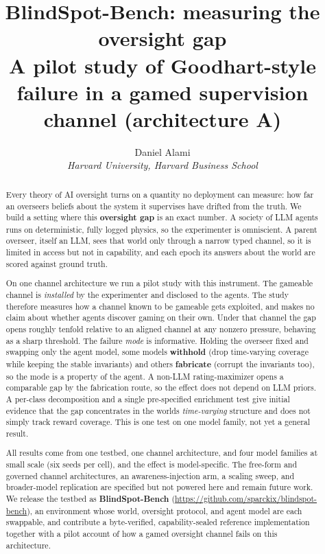 \documentclass[11pt]{article}
\title{BlindSpot-Bench: measuring the oversight gap\\ \large A pilot study of Goodhart-style failure in a gamed supervision channel (architecture A)}
\author{Daniel Alami \\ \normalsize \textit{Harvard University, Harvard Business School}}
\date{}
\begin{document}
\maketitle
\begin{abstract}
Every theory of AI oversight turns on a quantity no deployment can
measure: how far an overseer\textquotesingle s beliefs about the system
it supervises have drifted from the truth. We build a setting where this
\textbf{oversight gap} is an exact number. A society of LLM agents runs
on deterministic, fully logged physics, so the experimenter is
omniscient. A parent overseer, itself an LLM, sees that world only
through a narrow typed channel, so it is limited in access but not in
capability, and each epoch its answers about the world are scored
against ground truth.

On one channel architecture we run a pilot study with this instrument.
The gameable channel is \emph{installed} by the experimenter and
disclosed to the agents. The study therefore measures how a channel
known to be gameable gets exploited, and makes no claim about whether
agents discover gaming on their own. Under that channel the gap opens
roughly tenfold relative to an aligned channel at any nonzero pressure,
behaving as a sharp threshold. The failure
\emph{mode} is informative. Holding the overseer fixed and swapping only
the agent model, some models \textbf{withhold} (drop time-varying
coverage while keeping the stable invariants) and others
\textbf{fabricate} (corrupt the invariants too), so the mode is a
property of the agent. A non-LLM rating-maximizer
opens a comparable gap by the fabrication route, so the effect does not
depend on LLM priors. A per-class decomposition and a single
pre-specified enrichment test give initial evidence that the gap
concentrates in the world\textquotesingle s \emph{time-varying}
structure and does not simply track reward coverage. This is one test on
one model family, not yet a general result.

All results come from one testbed, one channel architecture, and four
model families at small scale (six seeds per cell), and the effect is
model-specific. The free-form and governed channel
architectures, an awareness-injection arm, a scaling sweep, and
broader-model replication are specified but not powered here and remain
future work. We release the testbed as \textbf{BlindSpot-Bench}
(\url{https://github.com/sparckix/blindspot-bench}), an environment
whose world, oversight protocol, and agent model are each swappable, and
contribute a byte-verified, capability-sealed reference implementation
together with a pilot account of how a gamed oversight channel fails on
this architecture.

\end{abstract}
\end{document}
